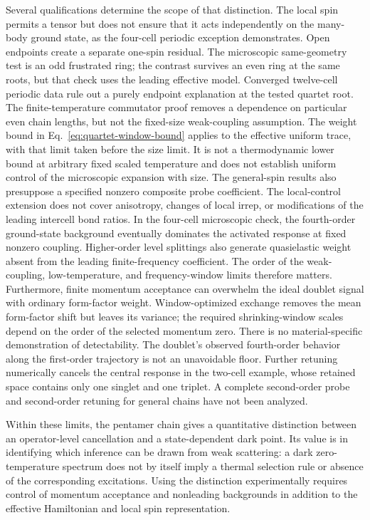 Several qualifications determine the scope of that distinction. The local
spin permits a tensor but does not ensure that it acts independently on the
many-body ground state, as the four-cell periodic exception demonstrates.
Open endpoints create a separate one-spin residual. The microscopic
same-geometry test is an odd frustrated ring; the contrast survives an even
ring at the same roots, but that check uses the leading effective model.
Converged twelve-cell periodic data rule out a purely endpoint explanation
at the tested quartet root. The finite-temperature commutator proof removes
a dependence on particular even chain lengths, but not the fixed-size
weak-coupling assumption. The weight bound in
Eq.~\eqref{eq:quartet-window-bound} applies to the effective uniform trace,
with that limit taken before the size limit. It is not a thermodynamic
lower bound at arbitrary fixed scaled temperature and does not establish
uniform control of the microscopic expansion with size. The general-spin
results also presuppose a specified nonzero composite probe coefficient.
The local-control extension does not cover anisotropy, changes of local
irrep, or modifications of the leading intercell bond ratios.
In the four-cell microscopic check, the fourth-order
ground-state background eventually dominates the activated response at
fixed nonzero coupling. Higher-order level splittings also generate
quasielastic weight absent from the leading finite-frequency coefficient.
The order of the weak-coupling, low-temperature, and frequency-window
limits therefore matters. Furthermore,
finite momentum acceptance can overwhelm the ideal doublet signal with
ordinary form-factor weight. Window-optimized exchange removes the mean
form-factor shift but leaves its variance; the required shrinking-window
scales depend on the order of the selected momentum zero.
There is no material-specific demonstration of detectability.
The doublet's observed fourth-order behavior along the first-order
trajectory is not an unavoidable floor. Further retuning numerically
cancels the central response in the two-cell example, whose retained
space contains only one singlet and one triplet. A complete second-order
probe and second-order retuning for general chains have not been analyzed.

Within these limits, the pentamer chain gives a quantitative distinction
between an operator-level cancellation and a state-dependent dark point.
Its value is in identifying which inference can be drawn from weak
scattering: a dark zero-temperature spectrum does not by itself imply a
thermal selection rule or absence of the corresponding excitations.
Using the distinction experimentally requires control of momentum
acceptance and nonleading backgrounds in addition to the effective
Hamiltonian and local spin representation.
